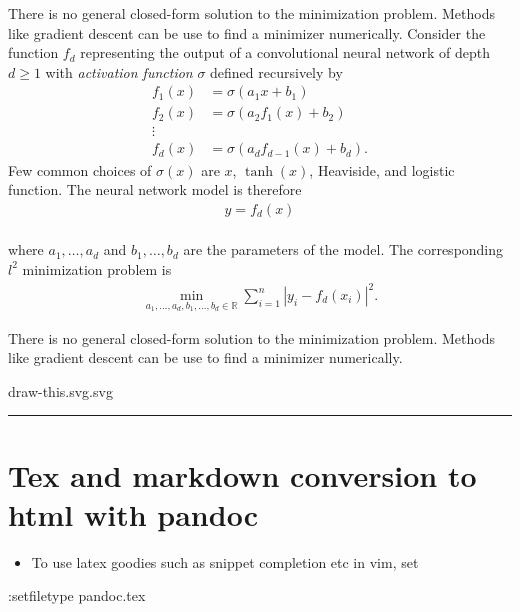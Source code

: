 \documentclass[
]{article}
\newenvironment{Shaded}{}{}
\newcommand{\NormalTok}[1]{#1}
\providecommand{\tightlist}{%
  \setlength{\itemsep}{0pt}\setlength{\parskip}{0pt}}
\newcommand{\1}{\boldsymbol{1}}
\begin{document}
There is no general closed-form solution to the minimization problem.
Methods like gradient descent can be use to find a minimizer
numerically. Consider the function \(f_d\) representing the output of a
convolutional neural network of depth \(d \ge 1\) with \emph{activation
function} \(\sigma\) defined recursively by \begin{align*}
    f_1(x) &= \sigma(a_1 x + b_1)
    \\
    f_2(x) &= \sigma(a_2 f_1(x) + b_2)
    \\
    \vdots
    \\
    f_d(x) &= \sigma(a_d f_{d-1}(x) + b_d).
\end{align*} Few common choices of \(\sigma(x)\) are \(x\),
\(\tanh(x)\), Heaviside, and logistic function. The neural network model
is therefore \begin{align*}
    y = f_d(x)
\end{align*}\\
where \(a_1, \dots, a_d\) and \(b_1, \dots, b_d\) are the parameters of
the model. The corresponding \(l^2\) minimization problem is
\begin{align*}
    \min_{a_1, \dots, a_d, b_1, \dots, b_d \in \mathbb{R}} \sum_{i=1}^{n} \left\lvert y_i - f_d(x_i)\right\rvert^2.
\end{align*}

There is no general closed-form solution to the minimization problem.
Methods like gradient descent can be use to find a minimizer
numerically.

draw-this.svg.svg

\begin{center}\rule{0.5\linewidth}{0.5pt}\end{center}

\hypertarget{tex-and-markdown-conversion-to-html-with-pandoc}{%
\section{Tex and markdown conversion to html with
pandoc}\label{tex-and-markdown-conversion-to-html-with-pandoc}}

\begin{itemize}
\tightlist
\item
  To use latex goodies such as snippet completion etc in vim, set
\end{itemize}

\begin{Shaded}
\begin{Highlighting}[]
\NormalTok{:setfiletype pandoc.tex}
\end{Highlighting}
\end{Shaded}
\end{document}
